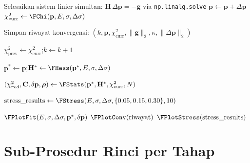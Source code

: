 \documentclass[11pt,a4paper]{article}
\begin{document}
\begin{algorithm}[H]
{    Selesaikan sistem linier simultan: $\mathbf{H} \, \Delta\mathbf{p} = -\mathbf{g}$ via \texttt{np.linalg.solve}\;
    $\mathbf{p} \leftarrow \mathbf{p} + \Delta\mathbf{p}$\;
    $\chi^2_{\text{curr}} \leftarrow \FChi(\mathbf{p}, E, \sigma, \Delta\sigma)$\;
    
    Simpan riwayat konvergensi: $(k, \mathbf{p}, \chi^2_{\text{curr}}, \|\mathbf{g}\|_2, \kappa, \|\Delta\mathbf{p}\|_2)$\;
    
    $\chi^2_{\text{prev}} \leftarrow \chi^2_{\text{curr}}$;\quad $k \leftarrow k + 1$\;
}
$\mathbf{p}^* \leftarrow \mathbf{p}$;\quad $\mathbf{H}^* \leftarrow \FHess(\mathbf{p}^*, E, \sigma, \Delta\sigma)$\;

\BlankLine
{}
$(\chi^2_{red}, \mathbf{C}, \delta\mathbf{p}, \boldsymbol{\rho}) \leftarrow \FStats(\mathbf{p}^*, \mathbf{H}^*, \chi^2_{\text{curr}}, N)$\;

\BlankLine
{}
$\text{stress\_results} \leftarrow \FStress(E, \sigma, \Delta\sigma, \{0.05, 0.15, 0.30\}, 10)$\;

\BlankLine
{}
$\FPlotFit(E, \sigma, \Delta\sigma, \mathbf{p}^*, \delta\mathbf{p})$\;
$\FPlotConv(\text{riwayat})$\;
$\FPlotStress(\text{stress\_results})$\;

\BlankLine
{}\;
\end{algorithm}

\newpage
\section{Sub-Prosedur Rinci per Tahap}
\end{document}

